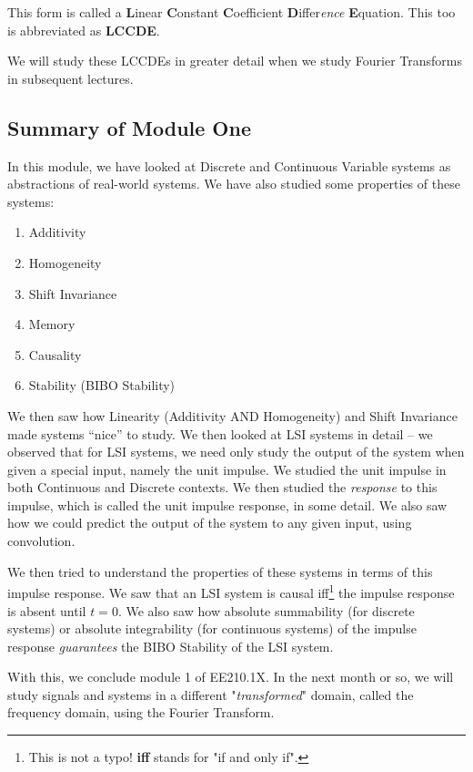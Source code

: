 This form is called a \textbf{L}inear \textbf{C}onstant \textbf{C}oefficient \textbf{D}iffer\emph{ence} \textbf{E}quation. This too is abbreviated as \textbf{LCCDE}.

We will study these LCCDEs in greater detail when we study Fourier Transforms in subsequent lectures.

\subsection{Summary of Module One}
In this module, we have looked at Discrete and Continuous Variable systems as abstractions of real-world systems. We have also studied some properties of these systems:
\begin{enumerate}
\item Additivity
\item Homogeneity
\item Shift Invariance
\item Memory
\item Causality
\item Stability (BIBO Stability)
\end{enumerate}
We then saw how Linearity (Additivity AND Homogeneity) and Shift Invariance made systems ``nice'' to study. We then looked at LSI systems in detail -- we observed that for LSI systems, we need only study the output of the system when given a special input, namely the unit impulse. We studied the unit impulse in both Continuous and Discrete contexts. We then studied the \emph{response} to this impulse, which is called the unit impulse response, in some detail. We also saw how we could predict the output of the system to any given input, using convolution.

We then tried to understand the properties of these systems in terms of this impulse response. We saw that an LSI system is causal iff\footnote{This is not a typo! \textbf{iff} stands for "if and only if".} the impulse response is absent until $t=0$. We also saw how absolute summability (for discrete systems) or absolute integrability (for continuous systems) of the impulse response \emph{guarantees} the BIBO Stability of the LSI system.

With this, we conclude module 1 of EE210.1X. In the next month or so, we will study signals and systems in a different "\emph{transformed}" domain, called the frequency domain, using the Fourier Transform.

